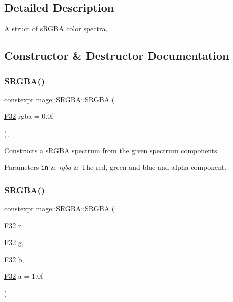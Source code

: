 \subsection{Detailed Description}
A struct of s\+R\+G\+BA color spectra. 

\subsection{Constructor \& Destructor Documentation}
\hypertarget{structmage_1_1_s_r_g_b_a_ab2d736d077534d550020b0f01e5780ae}{}\label{structmage_1_1_s_r_g_b_a_ab2d736d077534d550020b0f01e5780ae} 
\subsubsection{\texorpdfstring{S\+R\+G\+B\+A()}{SRGBA()}\hspace{0.1cm}{\footnotesize\ttfamily [1/7]}}
{\footnotesize\ttfamily constexpr mage\+::\+S\+R\+G\+B\+A\+::\+S\+R\+G\+BA (\begin{DoxyParamCaption}\item[{\hyperlink{namespacemage_aa97e833b45f06d60a0a9c4fc22ae02c0}{F32}}]{rgba = {\ttfamily 0.0f} }\end{DoxyParamCaption})\hspace{0.3cm}{\ttfamily [explicit]}, {\ttfamily [noexcept]}}

Constructs a s\+R\+G\+BA spectrum from the given spectrum components.


\begin{DoxyParams}[1]{Parameters}
\mbox{\tt in}  & {\em rgba} & The red, green and blue and alpha component. \\
\hline
\end{DoxyParams}
\hypertarget{structmage_1_1_s_r_g_b_a_a159096e69a7e18eee0d6718d244a1493}{}\label{structmage_1_1_s_r_g_b_a_a159096e69a7e18eee0d6718d244a1493} 
\subsubsection{\texorpdfstring{S\+R\+G\+B\+A()}{SRGBA()}\hspace{0.1cm}{\footnotesize\ttfamily [2/7]}}
{\footnotesize\ttfamily constexpr mage\+::\+S\+R\+G\+B\+A\+::\+S\+R\+G\+BA (\begin{DoxyParamCaption}\item[{\hyperlink{namespacemage_aa97e833b45f06d60a0a9c4fc22ae02c0}{F32}}]{r,  }\item[{\hyperlink{namespacemage_aa97e833b45f06d60a0a9c4fc22ae02c0}{F32}}]{g,  }\item[{\hyperlink{namespacemage_aa97e833b45f06d60a0a9c4fc22ae02c0}{F32}}]{b,  }\item[{\hyperlink{namespacemage_aa97e833b45f06d60a0a9c4fc22ae02c0}{F32}}]{a = {\ttfamily 1.0f} }\end{DoxyParamCaption})\hspace{0.3cm}{\ttfamily [noexcept]}}

